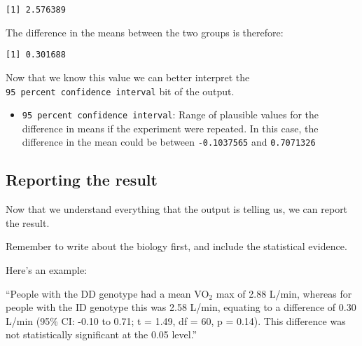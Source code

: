 \documentclass[
  letterpaper,
  DIV=11,
  numbers=noendperiod]{scrartcl}
\newenvironment{Shaded}{\begin{snugshade}}{\end{snugshade}}
\newcommand{\AttributeTok}[1]{\textcolor[rgb]{0.40,0.45,0.13}{#1}}
\newcommand{\FunctionTok}[1]{\textcolor[rgb]{0.28,0.35,0.67}{#1}}
\newcommand{\NormalTok}[1]{\textcolor[rgb]{0.00,0.23,0.31}{#1}}
\newcommand{\SpecialCharTok}[1]{\textcolor[rgb]{0.37,0.37,0.37}{#1}}
\providecommand{\tightlist}{%
  \setlength{\itemsep}{0pt}\setlength{\parskip}{0pt}}\usepackage{longtable,booktabs,array}
\begin{document}
\begin{Shaded}
\end{Shaded}

\begin{verbatim}
[1] 2.576389
\end{verbatim}

The difference in the means between the two groups is therefore:

\begin{Shaded}
\end{Shaded}

\begin{verbatim}
[1] 0.301688
\end{verbatim}

Now that we know this value we can better interpret the
\texttt{95\ percent\ confidence\ interval} bit of the output.

\begin{itemize}
\tightlist
\item
  \texttt{95\ percent\ confidence\ interval}: Range of plausible values
  for the difference in means if the experiment were repeated. In this
  case, the difference in the mean could be between \texttt{-0.1037565}
  and \texttt{0.7071326}
\end{itemize}

\subsection{Reporting the result}\label{reporting-the-result}

Now that we understand everything that the output is telling us, we can
report the result.

Remember to write about the biology first, and include the statistical
evidence.

Here's an example:

``People with the DD genotype had a mean VO\(_2\) max of 2.88 L/min,
whereas for people with the ID genotype this was 2.58 L/min, equating to
a difference of 0.30 L/min (95\% CI: -0.10 to 0.71; t = 1.49, df = 60, p
= 0.14). This difference was not statistically significant at the 0.05
level.''
\end{document}
